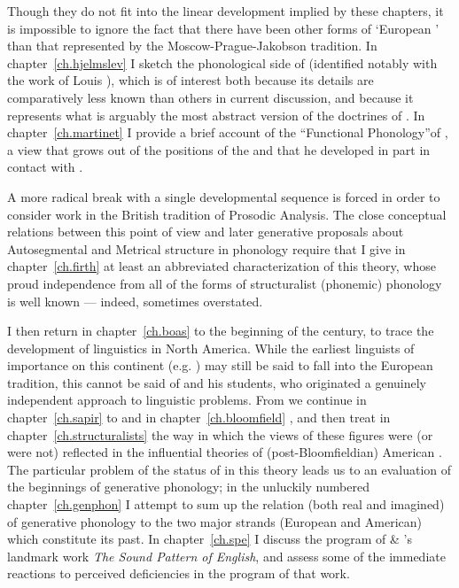 Though they do not fit into the linear development implied by these
chapters, it is impossible to ignore the fact that there have been
other forms of `European ' than that represented by the
Moscow-Prague-Jakobson tradition. In chapter~\ref{ch.hjelmslev} I
sketch the phonological side of  (identified notably
with the work of Louis {\Hjelmslev}), which is of interest both because
its details are comparatively less known than others in current
discussion, and because it represents what is arguably the most
abstract version of the doctrines of .  In
chapter~\ref{ch.martinet} I provide a brief account of the ``Functional
Phonology''of , a view that grows out of the positions
of the  and that he developed in part in contact with
{\Hjelmslev}.

A more radical break with a single developmental sequence is forced in
order to consider work in the British tradition of Prosodic Analysis.
The close conceptual relations between this point of view and later
generative proposals about Autosegmental and Metrical structure in
phonology require that I give in chapter~\ref{ch.firth} at least an
abbreviated characterization of this theory, whose proud independence
from all of the forms of structuralist (phonemic) phonology is well
known --- indeed, sometimes overstated.

I then return in chapter~\ref{ch.boas} to the beginning of the
century, to trace the development of linguistics in North America.
While the earliest linguists of importance on this continent (e.g.
{\Whitney}) may still be said to fall into the European tradition, this
cannot be said of  and his students, who originated a
genuinely independent approach to linguistic problems.  From {\Boas} we
continue in chapter~\ref{ch.sapir} to {\Sapir} and in
chapter~\ref{ch.bloomfield} {\Bloomfield}, and then treat in
chapter~\ref{ch.structuralists} the way in which the views of these
figures were (or were not) reflected in the influential theories of
(post-Bloomfieldian) American .  The particular problem
of the status of  in this theory leads us to an
evaluation of the beginnings of generative phonology; in the unluckily
numbered chapter~\ref{ch.genphon} I attempt to sum up the relation
(both real and imagined) of generative phonology to the two major
strands (European and American) which constitute its past. In
chapter~\ref{ch.spe} I discuss the program of {\Chomsky} \& {\Halle}'s
landmark work \textsl{The Sound Pattern of English}, and assess some
of the immediate reactions to perceived deficiencies in the program of
that work. 

